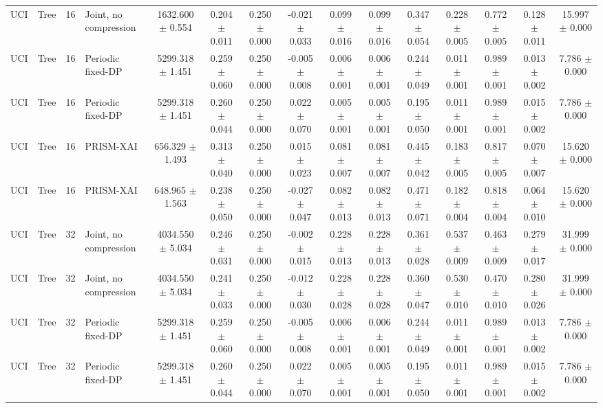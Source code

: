 \begin{table}[t]
\begin{tabular}{llllccccccccccc}
UCI & Tree & 16 & Joint, no compression & 1632.600 $\pm$ 0.554 & 0.204 $\pm$ 0.011 & 0.250 $\pm$ 0.000 & -0.021 $\pm$ 0.033 & 0.099 $\pm$ 0.016 & 0.099 $\pm$ 0.016 & 0.347 $\pm$ 0.054 & 0.228 $\pm$ 0.005 & 0.772 $\pm$ 0.005 & 0.128 $\pm$ 0.011 & 15.997 $\pm$ 0.000 \\
UCI & Tree & 16 & Periodic fixed-DP & 5299.318 $\pm$ 1.451 & 0.259 $\pm$ 0.060 & 0.250 $\pm$ 0.000 & -0.005 $\pm$ 0.008 & 0.006 $\pm$ 0.001 & 0.006 $\pm$ 0.001 & 0.244 $\pm$ 0.049 & 0.011 $\pm$ 0.001 & 0.989 $\pm$ 0.001 & 0.013 $\pm$ 0.002 & 7.786 $\pm$ 0.000 \\
UCI & Tree & 16 & Periodic fixed-DP & 5299.318 $\pm$ 1.451 & 0.260 $\pm$ 0.044 & 0.250 $\pm$ 0.000 & 0.022 $\pm$ 0.070 & 0.005 $\pm$ 0.001 & 0.005 $\pm$ 0.001 & 0.195 $\pm$ 0.050 & 0.011 $\pm$ 0.001 & 0.989 $\pm$ 0.001 & 0.015 $\pm$ 0.002 & 7.786 $\pm$ 0.000 \\
UCI & Tree & 16 & PRISM-XAI & 656.329 $\pm$ 1.493 & 0.313 $\pm$ 0.040 & 0.250 $\pm$ 0.000 & 0.015 $\pm$ 0.023 & 0.081 $\pm$ 0.007 & 0.081 $\pm$ 0.007 & 0.445 $\pm$ 0.042 & 0.183 $\pm$ 0.005 & 0.817 $\pm$ 0.005 & 0.070 $\pm$ 0.007 & 15.620 $\pm$ 0.000 \\
UCI & Tree & 16 & PRISM-XAI & 648.965 $\pm$ 1.563 & 0.238 $\pm$ 0.050 & 0.250 $\pm$ 0.000 & -0.027 $\pm$ 0.047 & 0.082 $\pm$ 0.013 & 0.082 $\pm$ 0.013 & 0.471 $\pm$ 0.071 & 0.182 $\pm$ 0.004 & 0.818 $\pm$ 0.004 & 0.064 $\pm$ 0.010 & 15.620 $\pm$ 0.000 \\
UCI & Tree & 32 & Joint, no compression & 4034.550 $\pm$ 5.034 & 0.246 $\pm$ 0.031 & 0.250 $\pm$ 0.000 & -0.002 $\pm$ 0.015 & 0.228 $\pm$ 0.013 & 0.228 $\pm$ 0.013 & 0.361 $\pm$ 0.028 & 0.537 $\pm$ 0.009 & 0.463 $\pm$ 0.009 & 0.279 $\pm$ 0.017 & 31.999 $\pm$ 0.000 \\
UCI & Tree & 32 & Joint, no compression & 4034.550 $\pm$ 5.034 & 0.241 $\pm$ 0.033 & 0.250 $\pm$ 0.000 & -0.012 $\pm$ 0.030 & 0.228 $\pm$ 0.028 & 0.228 $\pm$ 0.028 & 0.360 $\pm$ 0.047 & 0.530 $\pm$ 0.010 & 0.470 $\pm$ 0.010 & 0.280 $\pm$ 0.026 & 31.999 $\pm$ 0.000 \\
UCI & Tree & 32 & Periodic fixed-DP & 5299.318 $\pm$ 1.451 & 0.259 $\pm$ 0.060 & 0.250 $\pm$ 0.000 & -0.005 $\pm$ 0.008 & 0.006 $\pm$ 0.001 & 0.006 $\pm$ 0.001 & 0.244 $\pm$ 0.049 & 0.011 $\pm$ 0.001 & 0.989 $\pm$ 0.001 & 0.013 $\pm$ 0.002 & 7.786 $\pm$ 0.000 \\
UCI & Tree & 32 & Periodic fixed-DP & 5299.318 $\pm$ 1.451 & 0.260 $\pm$ 0.044 & 0.250 $\pm$ 0.000 & 0.022 $\pm$ 0.070 & 0.005 $\pm$ 0.001 & 0.005 $\pm$ 0.001 & 0.195 $\pm$ 0.050 & 0.011 $\pm$ 0.001 & 0.989 $\pm$ 0.001 & 0.015 $\pm$ 0.002 & 7.786 $\pm$ 0.000 \\

\end{tabular}
\end{table}
